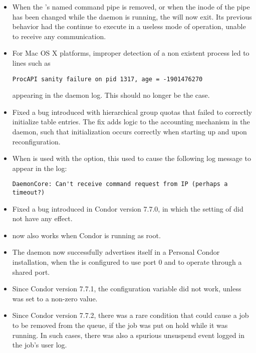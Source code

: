 \begin{itemize}

\item When the 's named command pipe is removed, 
or when the inode of the pipe has been changed while the daemon is running, 
the  will now exit.
Its previous behavior had the  continue to execute 
in a useless mode of operation, unable to receive any communication.

\item For Mac OS X platforms, 
improper detection of a non existent process led to lines such as
\begin{verbatim}
ProcAPI sanity failure on pid 1317, age = -1901476270
\end{verbatim}
appearing in the  daemon log.
This should no longer be the case.

\item Fixed a bug introduced with hierarchical group quotas that
failed to correctly initialize table entries.
The fix adds logic to the accounting mechanism in the
 daemon,
such that initialization occurs correctly 
when starting up and upon reconfiguration.

\item When  is used with the  option, this
used to cause the following log message to appear in the 
log:
\begin{verbatim}
DaemonCore: Can't receive command request from IP (perhaps a timeout?)
\end{verbatim}

\item Fixed a bug introduced in Condor version 7.7.0,
in which the setting of  did not have any effect.

\item {} now also works when Condor is running as root.

\item The  daemon now successfully advertises itself in 
a Personal Condor installation,
when the  is configured to use port 0
and to operate through a shared port.

\item Since Condor version 7.7.1, 
the configuration variable  did not work,
unless  was set to a non-zero value.

\item Since Condor version 7.7.2, there was a rare condition that could cause
a job to be removed from the queue,
if the job was put on hold while it was running.
In such cases, there was also a spurious
unsuspend event logged in the job's user log.

\end{itemize}

